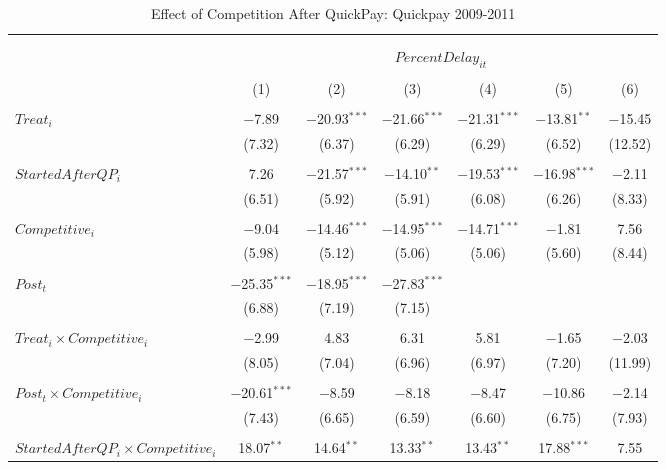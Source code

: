 \documentclass[
]{article}
\begin{document}
\begin{table}[H] \centering 
  \caption{Effect of Competition After QuickPay: Quickpay 2009-2011} 
  \label{} 
\small 
\begin{tabular}{@{\extracolsep{-3pt}}lcccccc} 
\\[-1.8ex]\hline 
\hline \\[-1.8ex] 
\\[-1.8ex] & \multicolumn{6}{c}{$PercentDelay_{it}$  } \\ 
\\[-1.8ex] & (1) & (2) & (3) & (4) & (5) & (6)\\ 
\hline \\[-1.8ex] 
 $Treat_i$ & $-$7.89 & $-$20.93$^{***}$ & $-$21.66$^{***}$ & $-$21.31$^{***}$ & $-$13.81$^{**}$ & $-$15.45 \\ 
  & (7.32) & (6.37) & (6.29) & (6.29) & (6.52) & (12.52) \\ 
  & & & & & & \\ 
 $StartedAfterQP_i$ & 7.26 & $-$21.57$^{***}$ & $-$14.10$^{**}$ & $-$19.53$^{***}$ & $-$16.98$^{***}$ & $-$2.11 \\ 
  & (6.51) & (5.92) & (5.91) & (6.08) & (6.26) & (8.33) \\ 
  & & & & & & \\ 
 $Competitive_i$ & $-$9.04 & $-$14.46$^{***}$ & $-$14.95$^{***}$ & $-$14.71$^{***}$ & $-$1.81 & 7.56 \\ 
  & (5.98) & (5.12) & (5.06) & (5.06) & (5.60) & (8.44) \\ 
  & & & & & & \\ 
 $Post_t$ & $-$25.35$^{***}$ & $-$18.95$^{***}$ & $-$27.83$^{***}$ &  &  &  \\ 
  & (6.88) & (7.19) & (7.15) &  &  &  \\ 
  & & & & & & \\ 
 $Treat_i \times Competitive_i$ & $-$2.99 & 4.83 & 6.31 & 5.81 & $-$1.65 & $-$2.03 \\ 
  & (8.05) & (7.04) & (6.96) & (6.97) & (7.20) & (11.99) \\ 
  & & & & & & \\ 
 $Post_t \times Competitive_i$ & $-$20.61$^{***}$ & $-$8.59 & $-$8.18 & $-$8.47 & $-$10.86 & $-$2.14 \\ 
  & (7.43) & (6.65) & (6.59) & (6.60) & (6.75) & (7.93) \\ 
  & & & & & & \\ 
 $StartedAfterQP_i \times Competitive_i$ & 18.07$^{**}$ & 14.64$^{**}$ & 13.33$^{**}$ & 13.43$^{**}$ & 17.88$^{***}$ & 7.55 \\ 

\end{tabular}
\end{table}
\end{document}

